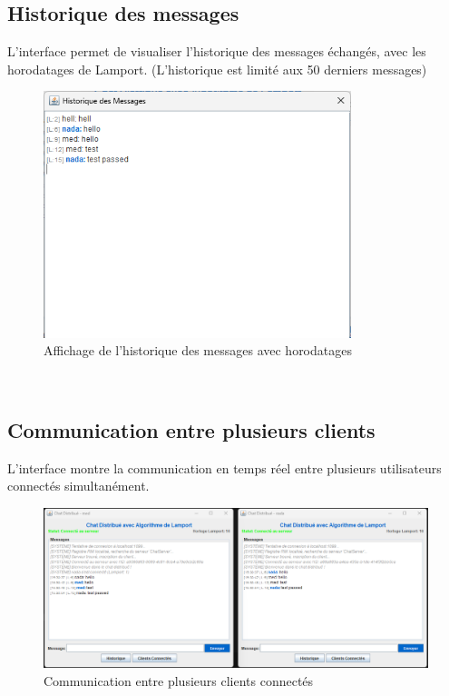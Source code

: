 \documentclass[a4paper,12pt]{article}
\begin{document}
\subsection{Historique des messages}
L'interface permet de visualiser l'historique des messages échangés, avec les horodatages de Lamport.
(L'historique est limité aux 50 derniers messages)
\begin{figure}[ht!]
    \centering
    \includegraphics[width=0.8\textwidth]{history.png}
    \caption{Affichage de l'historique des messages avec horodatages}
\end{figure}
\FloatBarrier\
\subsection{Communication entre plusieurs clients}
L'interface montre la communication en temps réel entre plusieurs utilisateurs connectés simultanément.

\begin{figure}[ht!]
    \centering
    \includegraphics[width=1\textwidth]{twoClients.png}
    \caption{Communication entre plusieurs clients connectés}
\end{figure}
\FloatBarrier\
\end{document}
